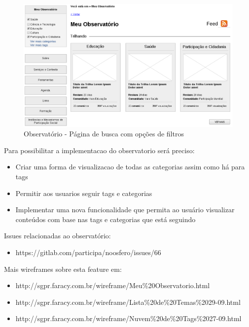 \documentclass[12pt]{article}
\begin{document}
\begin{figure}[h]
\center
\includegraphics[scale=0.5]{observatorio-wireframe.png}
\caption{Observatório - Página de busca com opções de filtros}
\label{observatorio-wireframe}
\end{figure}

Para possibilitar a implementacao do observatorio será preciso:

\begin{itemize}
  \item Criar uma forma de visualizacao de todas as categorias assim como há para tags
  \item Permitir aos usuarios seguir tags e categorias
  \item Implementar uma nova funcionalidade que permita ao usuário visualizar conteúdos com base nas tags e categorias que está seguindo
\end{itemize}

Issues relacionadas ao observatório:

\begin{itemize}
  \item https://gitlab.com/participa/noosfero/issues/66
\end{itemize}

Mais wireframes sobre esta feature em:

\begin{itemize}
  \item http://sgpr.faracy.com.br/wireframe/Meu\%20Observatorio.html
  \item http://sgpr.faracy.com.br/wireframe/Lista\%20de\%20Temas\%2029-09.html
  \item http://sgpr.faracy.com.br/wireframe/Nuvem\%20de\%20Tags\%2027-09.html
\end{itemize}
\end{document}
